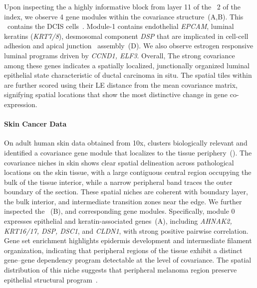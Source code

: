 \documentclass[pdflatex,sn-mathphys-num]{sn-jnl}%
\theoremstyle{thmstyleone}%
\theoremstyle{thmstyletwo}%
\theoremstyle{thmstylethree}%
\begin{document}
Upon inspecting the a highly informative block from layer 11 of the \spdniche~2 of the \OurMethod index, we observe 4 gene modules within the covariance structure~(A,B). This \spdniche~contains the DCIS cells~\cite{breast}. Module-1 contains endothelial \textit{EPCAM}, luminal keratins (\textit{KRT7/8}), desmosomal component \textit{DSP} that are implicated in cell-cell adhesion and apical junction~\cite{winter2003epithelial, litvinov1997epithelial} assembly~(D). We also observe estrogen responsive luminal programs driven by \textit{CCND1, ELF3}. Overall, The strong covariance among these genes indicates a spatially localized, junctionally organized luminal epithelial state characteristic of ductal carcinoma in situ. The spatial tiles within  are further scored using their LE distance from the mean covariance matrix, signifying spatial locations that show the most distinctive change in gene co-expression. 

\paragraph{\textbf{Skin Cancer Data}} On adult human skin data obtained from 10x, \OurMethod clusters biologically relevant \spdniche and identified a covariance gene module that localizes to the tissue periphery~(). The covariance niches in skin shows clear spatial delineation across pathological locations on the skin tissue, with a large contiguous central region occupying the bulk of the tissue interior, while a narrow peripheral band traces the outer boundary of the section. These spatial niches are coherent with boundary layer, the bulk interior, and intermediate transition zones near the edge. We further inspected the ~(B), and corresponding gene modules. Specifically, module 0 expresses epithelial and keratin-associated genes~(A), including \textit{AHNAK2, KRT16/17, DSP, DSC1}, and \textit{CLDN1}, with strong positive pairwise correlation. Gene set enrichment highlights epidermis development and intermediate filament organization, indicating that peripheral regions of the tissue exhibit a distinct gene–gene dependency program detectable at the level of covariance. The spatial distribution of this niche suggests that peripheral melanoma region preserve epithelial structural program~\cite{fuchs1980changes}.  
\end{document}
